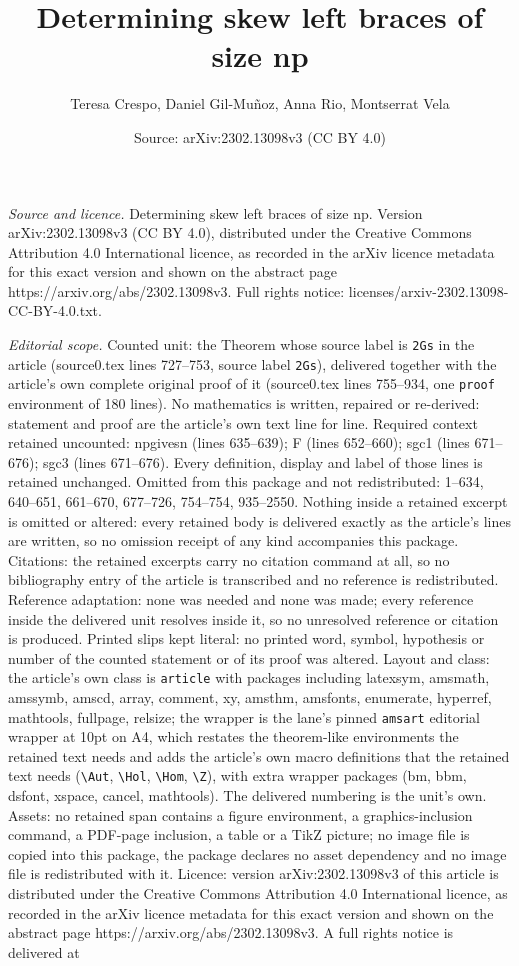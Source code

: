 \documentclass[10pt,a4paper]{amsart}
\title[Determining skew left braces of size np]{Determining skew left braces of size np}
\author{Teresa Crespo, Daniel Gil-Mu\~noz, Anna Rio, Montserrat Vela}
\date{Source: arXiv:2302.13098v3 (CC BY 4.0)}
\begin{document}
\maketitle

\noindent\emph{Source and licence.} Determining skew left braces of size np. Version arXiv:2302.13098v3 (CC BY 4.0), distributed under the Creative Commons Attribution 4.0 International licence, as recorded in the arXiv licence metadata for this exact version and shown on the abstract page https://arxiv.org/abs/2302.13098v3. Full rights notice: licenses/arxiv-2302.13098-CC-BY-4.0.txt.\par\smallskip

\noindent\textit{Editorial scope.} Counted unit: the Theorem whose source label is \texttt{2Gs} in the article (source0.tex lines 727--753, source label \texttt{2Gs}), delivered together with the article's own complete original proof of it (source0.tex lines 755--934, one \texttt{proof} environment of 180 lines). No mathematics is written, repaired or re-derived: statement and proof are the article's own text line for line. Required context retained uncounted: npgivesn (lines 635--639); F (lines 652--660); sgc1 (lines 671--676); sgc3 (lines 671--676). Every definition, display and label of those lines is retained unchanged. Omitted from this package and not redistributed: 1--634, 640--651, 661--670, 677--726, 754--754, 935--2550. Nothing inside a retained excerpt is omitted or altered: every retained body is delivered exactly as the article's lines are written, so no omission receipt of any kind accompanies this package. Citations: the retained excerpts carry no citation command at all, so no bibliography entry of the article is transcribed and no reference is redistributed. Reference adaptation: none was needed and none was made; every reference inside the delivered unit resolves inside it, so no unresolved reference or citation is produced. Printed slips kept literal: no printed word, symbol, hypothesis or number of the counted statement or of its proof was altered. Layout and class: the article's own class is \texttt{article} with packages including latexsym, amsmath, amssymb, amscd, array, comment, xy, amsthm, amsfonts, enumerate, hyperref, mathtools, fullpage, relsize; the wrapper is the lane's pinned \texttt{amsart} editorial wrapper at 10pt on A4, which restates the theorem-like environments the retained text needs and adds the article's own macro definitions that the retained text needs (\texttt{\textbackslash Aut}, \texttt{\textbackslash Hol}, \texttt{\textbackslash Hom}, \texttt{\textbackslash Z}), with extra wrapper packages (bm, bbm, dsfont, xspace, cancel, mathtools). The delivered numbering is the unit's own. Assets: no retained span contains a figure environment, a graphics-inclusion command, a PDF-page inclusion, a table or a TikZ picture; no image file is copied into this package, the package declares no asset dependency and no image file is redistributed with it. Licence: version arXiv:2302.13098v3 of this article is distributed under the Creative Commons Attribution 4.0 International licence, as recorded in the arXiv licence metadata for this exact version and shown on the abstract page https://arxiv.org/abs/2302.13098v3. A full rights notice is delivered at 
\end{document}
